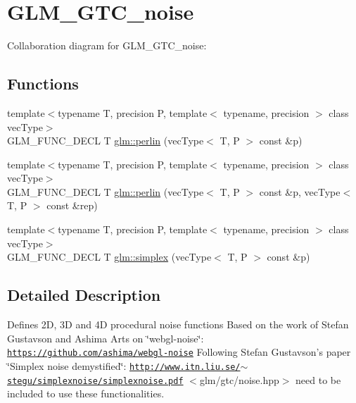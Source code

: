 \hypertarget{group__gtc__noise}{
\section{GLM\_\-GTC\_\-noise}
\label{group__gtc__noise}
}


Collaboration diagram for GLM\_\-GTC\_\-noise:\subsection*{Functions}
\begin{CompactItemize}
\item 
{\footnotesize template$<$typename T, precision P, template$<$ typename, precision $>$ class vecType$>$ }\\GLM\_\-FUNC\_\-DECL T \hyperlink{group__gtc__noise_g81bdad1f7221a08af5ea462c98f692f7}{glm::perlin} (vecType$<$ T, P $>$ const \&p)
\item 
{\footnotesize template$<$typename T, precision P, template$<$ typename, precision $>$ class vecType$>$ }\\GLM\_\-FUNC\_\-DECL T \hyperlink{group__gtc__noise_gfdb3eb82b2d5a45159a6425acd6ff398}{glm::perlin} (vecType$<$ T, P $>$ const \&p, vecType$<$ T, P $>$ const \&rep)
\item 
{\footnotesize template$<$typename T, precision P, template$<$ typename, precision $>$ class vecType$>$ }\\GLM\_\-FUNC\_\-DECL T \hyperlink{group__gtc__noise_g2c46feb8914501452e6bcdc04f33a0b2}{glm::simplex} (vecType$<$ T, P $>$ const \&p)
\end{CompactItemize}


\subsection{Detailed Description}
Defines 2D, 3D and 4D procedural noise functions Based on the work of Stefan Gustavson and Ashima Arts on \char`\"{}webgl-noise\char`\"{}: \href{https://github.com/ashima/webgl-noise}{\tt https://github.com/ashima/webgl-noise} Following Stefan Gustavson's paper \char`\"{}Simplex noise demystified\char`\"{}: \href{http://www.itn.liu.se/~stegu/simplexnoise/simplexnoise.pdf}{\tt http://www.itn.liu.se/$\sim$stegu/simplexnoise/simplexnoise.pdf} $<$glm/gtc/noise.hpp$>$ need to be included to use these functionalities. 

